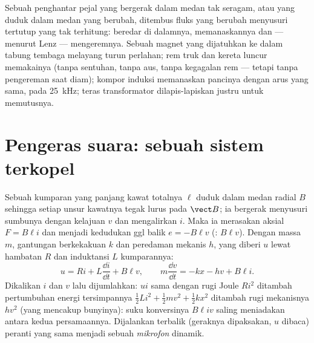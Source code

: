 \begin{example}\label{ex:b1:induction:eddy}
Sebuah penghantar pejal yang bergerak dalam medan tak seragam, atau yang duduk dalam
medan yang berubah, ditembus fluks yang berubah menyusuri  tertutup yang tak terhitung:
\emph{} beredar di dalamnya, memanaskannya dan --- menurut Lenz ---
mengeremnya. Sebuah magnet yang dijatuhkan ke dalam tabung tembaga melayang turun perlahan;
rem truk dan kereta luncur memakainya (tanpa sentuhan, tanpa aus, tanpa
kegagalan rem --- tetapi tanpa pengereman saat diam); kompor induksi memanaskan
pancinya dengan arus yang sama, pada \qty{25}{kHz}; teras transformator
dilapis-lapiskan justru untuk memutusnya.
\end{example}

\section{Pengeras suara: sebuah sistem terkopel}

\begin{proposition}\label{prop:b1:induction:loudspeaker}
Sebuah kumparan yang panjang kawat totalnya $\ell$ duduk dalam medan radial $B$ sehingga
setiap unsur kawatnya tegak lurus pada $\vect B$; ia bergerak menyusuri
sumbunya dengan kelajuan $v$ dan mengalirkan $i$. Maka ia merasakan  aksial
$F = B\ell i$ dan menjadi kedudukan ggl balik $e = -B\ell v$ (:  $B\ell v$). Dengan massa $m$, gantungan
berkekakuan $k$ dan peredaman mekanis $h$, yang diberi  $u$ lewat
hambatan $R$ dan induktansi $L$ kumparannya:
\[
u = Ri + L\frac{\dd i}{\dd t} + B\ell v , \qquad
m\frac{\dd v}{\dd t} = -kx - hv + B\ell i .
\]
Dikalikan $i$ dan $v$ lalu dijumlahkan:  $ui$
sama dengan rugi Joule $Ri^2$ ditambah pertumbuhan energi tersimpannya
$\tfrac12Li^2 + \tfrac12mv^2 + \tfrac12kx^2$ ditambah rugi mekanisnya
$hv^2$ (yang mencakup bunyinya): suku konversinya $B\ell iv$ saling meniadakan
antara kedua persamaannya. Dijalankan terbalik (geraknya dipaksakan, $u$ dibaca)
peranti yang sama menjadi sebuah \emph{mikrofon} dinamik.
\end{proposition}

